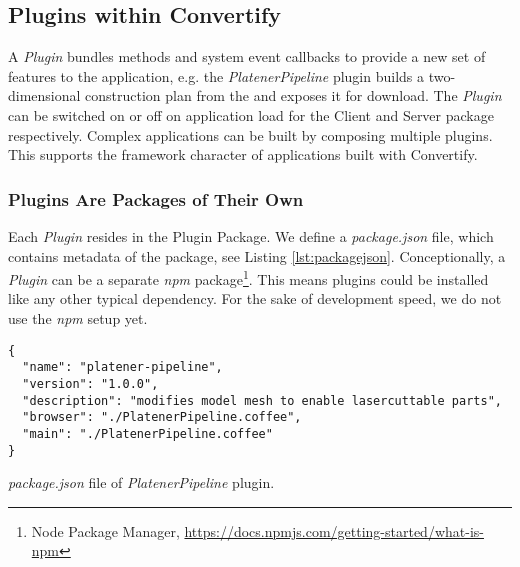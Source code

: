 \documentclass[../ClassicThesis.tex]{subfiles}
\begin{document}
\subsection{Plugins within Convertify}

A \emph{Plugin} bundles methods and system event callbacks to provide a new set
of features to the application, e.g. the \emph{PlatenerPipeline} plugin builds a
two-dimensional construction plan from the {\threedmodel} and exposes it for
download. The \emph{Plugin} can be switched on or off on application load for
the Client and Server package respectively. Complex applications can be built by
composing multiple plugins. This supports the framework character of
applications built with Convertify.






\subsubsection{Plugins Are Packages of Their Own}

Each \emph{Plugin} resides in the Plugin Package. We define a
\emph{package.json} file, which contains metadata of the package, see Listing
\ref{lst:packagejson}. Conceptionally, a \emph{Plugin} can be a separate
\emph{npm} package\footnote{Node Package Manager,
  \url{https://docs.npmjs.com/getting-started/what-is-npm}}. This means plugins
could be installed like any other typical dependency. For the sake of
development speed, we do not use the \emph{npm} setup yet.

\begin{listing}[ht]
\begin{verbatim}
{
  "name": "platener-pipeline",
  "version": "1.0.0",
  "description": "modifies model mesh to enable lasercuttable parts",
  "browser": "./PlatenerPipeline.coffee",
  "main": "./PlatenerPipeline.coffee"
}
\end{verbatim}
\caption{\emph{package.json} file of \emph{PlatenerPipeline} plugin.}
\label{lst:packagejson}
\end{listing}
\end{document}
